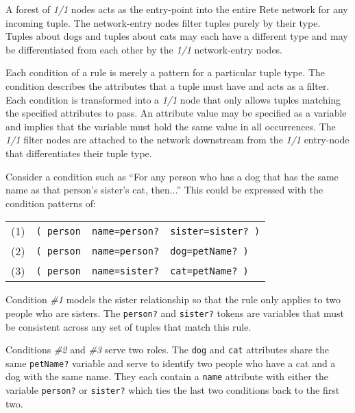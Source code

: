 A forest of \emph{1/1} nodes acts as the entry-point
into the entire Rete network for any incoming tuple.  The
network-entry  nodes filter tuples purely by their type.  
Tuples about dogs and tuples about cats may 
each have a different type and may be differentiated from each 
other by the \emph{1/1} network-entry nodes.

Each condition of a rule is merely a pattern for a particular tuple type.
The condition describes the attributes that a tuple must have and acts
as a filter.  Each condition is transformed into a \emph{1/1} node
that only allows tuples matching the specified attributes to pass.
An attribute value may be specified as a variable and implies that
the variable must hold the same value in all occurrences.
The \emph{1/1} filter nodes are attached to
the network downstream from the \emph{1/1} entry-node that
differentiates their tuple type.

Consider a condition such as ``For any person who has a dog that
has the same name as that person's sister's cat, then...''  This could
be expressed with the condition patterns of:

\medskip

\begin{tabular}{llll}

(1) & \texttt{( person} & \texttt{name=person?} & \texttt{sister=sister? )}\\
(2) & \texttt{( person} & \texttt{name=person?} & \texttt{dog=petName? )}\\
(3) & \texttt{( person} & \texttt{name=sister?} & \texttt{cat=petName? )}\\

\end{tabular}

\medskip

Condition \emph{\#1} models the sister relationship so
that the rule only applies to two people who are sisters.  The
\verb|person?| and \verb|sister?| tokens are variables that must be
consistent across any set of tuples that match this rule.  

Conditions \emph{\#2} and \emph{\#3} serve two roles.  The \verb|dog|
and \verb|cat| attributes share the same \verb|petName?| variable and
serve to identify two people who have a cat and a dog with the same
name.  They each contain a \verb|name| attribute with either the
variable \verb|person?| or \verb|sister?| which ties the last two
conditions back to the first two.

